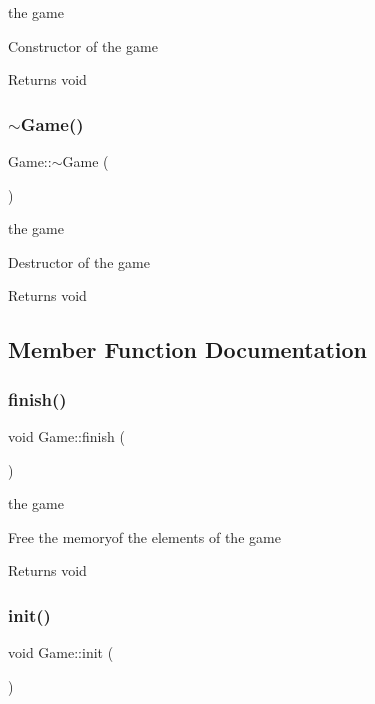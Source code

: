 the game

Constructor of the game

\begin{DoxyReturn}{Returns}
void 
\end{DoxyReturn}
\mbox{\label{class_game_ae3d112ca6e0e55150d2fdbc704474530}} 
\subsubsection{\texorpdfstring{$\sim$\+Game()}{~Game()}}
{\footnotesize\ttfamily Game\+::$\sim$\+Game (\begin{DoxyParamCaption}{ }\end{DoxyParamCaption})}

the game

Destructor of the game

\begin{DoxyReturn}{Returns}
void 
\end{DoxyReturn}


\subsection{Member Function Documentation}
\mbox{\label{class_game_a4a803542276ea0497ad3a87b8983dd67}} 
\subsubsection{\texorpdfstring{finish()}{finish()}}
{\footnotesize\ttfamily void Game\+::finish (\begin{DoxyParamCaption}{ }\end{DoxyParamCaption})}

the game

Free the memoryof the elements of the game

\begin{DoxyReturn}{Returns}
void 
\end{DoxyReturn}
\mbox{\label{class_game_a6f3a33940524b6ba9d83f627ccb14bbf}} 
\subsubsection{\texorpdfstring{init()}{init()}}
{\footnotesize\ttfamily void Game\+::init (\begin{DoxyParamCaption}{ }\end{DoxyParamCaption})}

